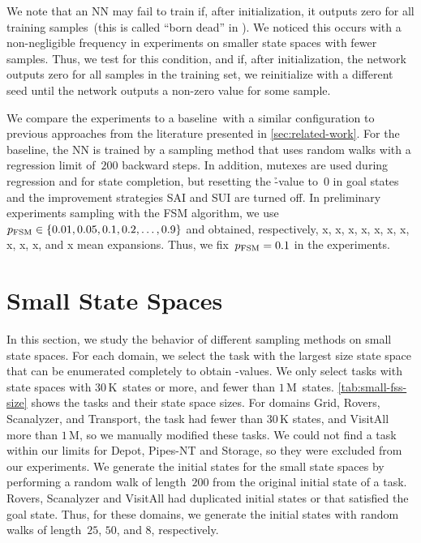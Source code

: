 We note that an NN may fail to train if, after initialization, it outputs zero for all training samples~(this is called ``born dead'' in \citet{lu2020dying}). We noticed this occurs with a non-negligible frequency in experiments on smaller state spaces with fewer samples. Thus, we test for this condition, and if, after initialization, the network outputs zero for all samples in the training set, we reinitialize with a different seed until the network outputs a non-zero value for some sample.

We compare the experiments to a baseline~\hnnbase with a similar configuration to previous approaches from the literature presented in \cref{sec:related-work}. For the baseline, the NN is trained by a sampling method that uses random walks with a regression limit of~$200$ backward steps. In addition, mutexes are used during regression and for state completion, but resetting the \h-value to~$0$ in goal states and the improvement strategies SAI and SUI are turned off. In preliminary experiments sampling with the FSM algorithm, we use $p_{\text{FSM}}\in\{0.01,0.05,0.1,0.2,\ldots,0.9\}$ and obtained, respectively, x, x, x, x, x, x, x, x, x, x, and x mean expansions. Thus, we fix~$p_{\text{FSM}} = 0.1$ in the experiments.

\section{Small State Spaces}
\label{sec:small-experiments}

In this section, we study the behavior of different sampling methods on small state spaces. For each domain, we select the task with the largest size state space that can be enumerated completely to obtain \hstar-values. We only select tasks with state spaces with $30$\,K~states or more, and fewer than $1$\,M~states. \cref{tab:small-fss-size} shows the tasks and their state space sizes. For domains Grid, Rovers, Scanalyzer, and Transport, the task had fewer than $30$\,K states, and VisitAll more than $1$\,M, so we manually modified these tasks. We could not find a task within our limits for Depot, Pipes-NT and Storage, so they were excluded from our experiments. We generate the initial states for the small state spaces by performing a random walk of length~$200$ from the original initial state of a task. Rovers, Scanalyzer and VisitAll had duplicated initial states or that satisfied the goal state. Thus, for these domains, we generate the initial states with random walks of length~$25$, $50$, and $8$, respectively.

